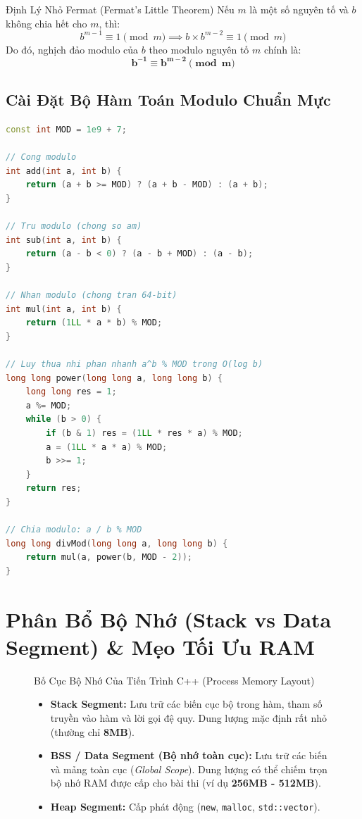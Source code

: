 \documentclass[11pt,a4paper]{article}
\begin{document}
\begin{conceptbox}{Định Lý Nhỏ Fermat (Fermat's Little Theorem)}
    Nếu $m$ là một số nguyên tố và $b$ không chia hết cho $m$, thì:
    $$b^{m-1} \equiv 1 \pmod m \implies b \times b^{m-2} \equiv 1 \pmod m$$
    Do đó, nghịch đảo modulo của $b$ theo modulo nguyên tố $m$ chính là:
    $$\mathbf{b^{-1} \equiv b^{m-2} \pmod m}$$
\end{conceptbox}

\subsection{Cài Đặt Bộ Hàm Toán Modulo Chuẩn Mực}

\begin{lstlisting}[language=C++]
const int MOD = 1e9 + 7;

// Cong modulo
int add(int a, int b) { 
    return (a + b >= MOD) ? (a + b - MOD) : (a + b); 
}

// Tru modulo (chong so am)
int sub(int a, int b) { 
    return (a - b < 0) ? (a - b + MOD) : (a - b); 
}

// Nhan modulo (chong tran 64-bit)
int mul(int a, int b) { 
    return (1LL * a * b) % MOD; 
}

// Luy thua nhi phan nhanh a^b % MOD trong O(log b)
long long power(long long a, long long b) {
    long long res = 1;
    a %= MOD;
    while (b > 0) {
        if (b & 1) res = (1LL * res * a) % MOD;
        a = (1LL * a * a) % MOD;
        b >>= 1;
    }
    return res;
}

// Chia modulo: a / b % MOD
long long divMod(long long a, long long b) {
    return mul(a, power(b, MOD - 2));
}
\end{lstlisting}

\vspace{15pt}
\section{Phân Bổ Bộ Nhớ (Stack vs Data Segment) \& Mẹo Tối Ưu RAM}

\begin{figure}[h!]
\centering
\begin{conceptbox}{Bố Cục Bộ Nhớ Của Tiến Trình C++ (Process Memory Layout)}
    \begin{itemize}
        \item \textbf{Stack Segment:} Lưu trữ các biến cục bộ trong hàm, tham số truyền vào hàm và lời gọi đệ quy. Dung lượng mặc định rất nhỏ (thường chỉ \textbf{8MB}).
        \item \textbf{BSS / Data Segment (Bộ nhớ toàn cục):} Lưu trữ các biến và mảng toàn cục (\textit{Global Scope}). Dung lượng có thể chiếm trọn bộ nhớ RAM được cấp cho bài thi (ví dụ \textbf{256MB - 512MB}).
        \item \textbf{Heap Segment:} Cấp phát động (\texttt{new}, \texttt{malloc}, \texttt{std::vector}).
    \end{itemize}
\end{conceptbox}
\end{figure}
\end{document}
